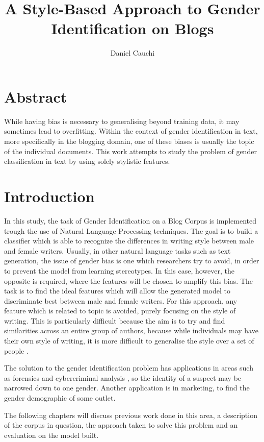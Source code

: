 \documentclass{article}
\begin{document}
\title{A Style-Based Approach to Gender Identification on Blogs}
\author{Daniel Cauchi}
\date{}
\maketitle

\section*{Abstract}
While having bias is necessary to generalising beyond training data, it may sometimes lead to overfitting. Within the context of gender identification in text, more specifically in the blogging domain, one of these biases is usually the topic of the individual documents. This work attempts to study the problem of gender classification in text by using solely stylistic features.

\section{Introduction}
In this study, the task of Gender Identification on a Blog Corpus is implemented trough the use of Natural Language Processing techniques. The goal is to build a classifier which is able to recognize the differences in writing style between male and female writers. Usually, in other natural language tasks such as text generation, the issue of gender bias is one which researchers try to avoid, in order to prevent the model from learning stereotypes. In this case, however, the opposite is required, where the features will be chosen to amplify this bias. The task is to find the ideal features which will allow the generated model to discriminate best between male and female writers. For this approach, any feature which is related to topic is avoided, purely focusing on the style of writing. This is particularly difficult because the aim is to try and find similarities across an entire group of authors, because while individuals may have their own style of writing, it is more difficult to generalise the style over a set of people \cite{3}.

The solution to the gender identification problem has applications in areas such as forensics \cite{2} and cybercriminal analysis \cite{1}, so the identity of a suspect may be narrowed down to one gender. Another application is in marketing, to find the gender demographic of some outlet.

The following chapters will discuss previous work done in this area, a description of the corpus in question, the approach taken to solve this problem and an evaluation on the model built.
\end{document}
